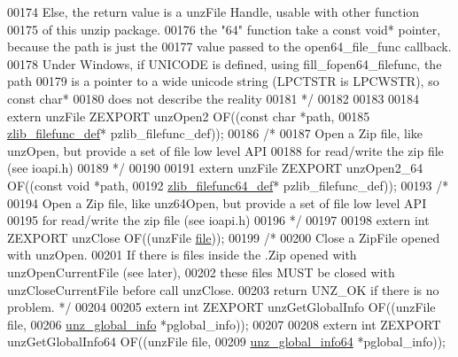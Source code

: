 \begin{DoxyCode}
00174 \textcolor{comment}{     Else, the return value is a unzFile Handle, usable with other function}
00175 \textcolor{comment}{       of this unzip package.}
00176 \textcolor{comment}{     the "64" function take a const void* pointer, because the path is just the}
00177 \textcolor{comment}{       value passed to the open64\_file\_func callback.}
00178 \textcolor{comment}{     Under Windows, if UNICODE is defined, using fill\_fopen64\_filefunc, the path}
00179 \textcolor{comment}{       is a pointer to a wide unicode string (LPCTSTR is LPCWSTR), so const char*}
00180 \textcolor{comment}{       does not describe the reality}
00181 \textcolor{comment}{*/}
00182 
00183 
00184 \textcolor{keyword}{extern} unzFile ZEXPORT unzOpen2 OF((\textcolor{keyword}{const} \textcolor{keywordtype}{char} *path,
00185                                     \hyperlink{structzlib__filefunc__def__s}{zlib\_filefunc\_def}* pzlib\_filefunc\_def));
00186 \textcolor{comment}{/*}
00187 \textcolor{comment}{   Open a Zip file, like unzOpen, but provide a set of file low level API}
00188 \textcolor{comment}{      for read/write the zip file (see ioapi.h)}
00189 \textcolor{comment}{*/}
00190 
00191 \textcolor{keyword}{extern} unzFile ZEXPORT unzOpen2\_64 OF((\textcolor{keyword}{const} \textcolor{keywordtype}{void} *path,
00192                                     \hyperlink{structzlib__filefunc64__def__s}{zlib\_filefunc64\_def}* pzlib\_filefunc\_def));
00193 \textcolor{comment}{/*}
00194 \textcolor{comment}{   Open a Zip file, like unz64Open, but provide a set of file low level API}
00195 \textcolor{comment}{      for read/write the zip file (see ioapi.h)}
00196 \textcolor{comment}{*/}
00197 
00198 \textcolor{keyword}{extern} \textcolor{keywordtype}{int} ZEXPORT unzClose OF((unzFile \hyperlink{structfile}{file}));
00199 \textcolor{comment}{/*}
00200 \textcolor{comment}{  Close a ZipFile opened with unzOpen.}
00201 \textcolor{comment}{  If there is files inside the .Zip opened with unzOpenCurrentFile (see later),}
00202 \textcolor{comment}{    these files MUST be closed with unzCloseCurrentFile before call unzClose.}
00203 \textcolor{comment}{  return UNZ\_OK if there is no problem. */}
00204 
00205 \textcolor{keyword}{extern} \textcolor{keywordtype}{int} ZEXPORT unzGetGlobalInfo OF((unzFile file,
00206                                         \hyperlink{structunz__global__info__s}{unz\_global\_info} *pglobal\_info));
00207 
00208 \textcolor{keyword}{extern} \textcolor{keywordtype}{int} ZEXPORT unzGetGlobalInfo64 OF((unzFile file,
00209                                         \hyperlink{structunz__global__info64__s}{unz\_global\_info64} *pglobal\_info));

\end{DoxyCode}

